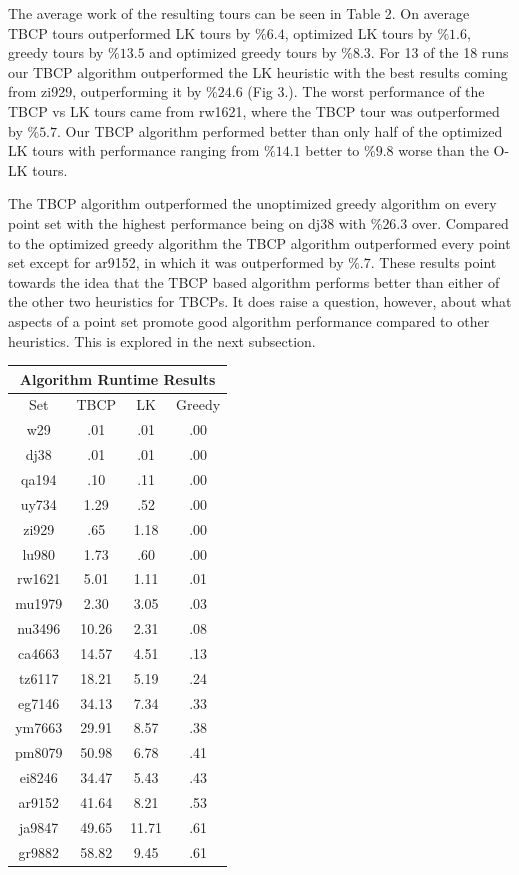 \documentclass[sigconf, anonymous, pdftex]{acmart}
\begin{document}
The average work of the resulting tours can be seen in Table 2. On average TBCP tours outperformed LK tours by $\%6.4$, optimized LK tours by $\%1.6$, greedy tours by $\%13.5$ and optimized greedy tours by $\%8.3$. For 13 of the 18 runs our TBCP algorithm outperformed the LK heuristic with the best results coming from zi929, outperforming it by $\%24.6$ (Fig 3.). The worst performance of the TBCP vs LK tours came from rw1621, where the TBCP tour was outperformed by $\%5.7$. Our TBCP algorithm performed better than only half of the optimized LK tours with performance ranging from $\%14.1$ better to $\%9.8$ worse than the O-LK tours.

The TBCP algorithm outperformed the unoptimized greedy algorithm on every point set with the highest performance being on dj38 with $\%26.3$ over. Compared to the optimized greedy algorithm the TBCP algorithm outperformed every point set except for ar9152, in which it was outperformed by $\%.7$. These results point towards the idea that the TBCP based algorithm performs better than either of the other two heuristics for TBCPs. It does raise a question, however, about what aspects of a point set promote good algorithm performance compared to other heuristics. This is explored in the next subsection.
\\
\begin{center}
\begin{tabular}{|c|c|c|c|}
 \hline
 \multicolumn{4}{|c|}{Algorithm Runtime Results} \\
 \hline
 Set & TBCP & LK & Greedy\\
 \hline
 w29 & .01 & .01 & .00\\
 \hline
 dj38 & .01 & .01 & .00\\
 \hline
 qa194 & .10 & .11 & .00\\
 \hline
 uy734 & 1.29 & .52 & .00\\
 \hline
 zi929 & .65 & 1.18 & .00\\
 \hline
 lu980 & 1.73 & .60 & .00\\
 \hline
 rw1621 & 5.01 & 1.11 & .01\\
 \hline
 mu1979 & 2.30 & 3.05 & .03\\
 \hline
 nu3496 & 10.26 & 2.31 & .08\\
 \hline
 ca4663 & 14.57 & 4.51 & .13\\
 \hline
 tz6117 & 18.21 & 5.19 & .24\\
 \hline
 eg7146 & 34.13 & 7.34 & .33\\
 \hline
 ym7663 & 29.91 & 8.57 & .38\\
 \hline
 pm8079 & 50.98 & 6.78 & .41\\
 \hline
 ei8246 & 34.47 & 5.43 & .43\\
 \hline
 ar9152 & 41.64 & 8.21 & .53\\
 \hline
 ja9847 & 49.65 & 11.71 & .61\\
 \hline
 gr9882 & 58.82 & 9.45 & .61\\
 \hline
\end{tabular}
\end{center}
\end{document}
